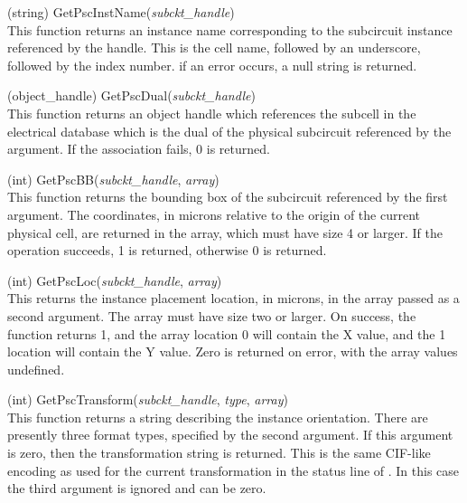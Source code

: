 \begin{description}
\item{(string) \vt GetPscInstName({\it subckt\_handle\/})}\\
This function returns an instance name corresponding to the subcircuit
instance referenced by the handle.  This is the cell name, followed by
an underscore, followed by the index number.  if an error occurs, a
null string is returned.

\item{(object\_handle) \vt GetPscDual({\it subckt\_handle\/})}\\
This function returns an object handle which references the subcell in
the electrical database which is the dual of the physical subcircuit
referenced by the argument.  If the association fails, 0 is returned.

\item{(int) \vt GetPscBB({\it subckt\_handle}, {\it array})}\\
This function returns the bounding box of the subcircuit referenced by
the first argument.  The coordinates, in microns relative to the
origin of the current physical cell, are returned in the array, which
must have size 4 or larger.  If the operation succeeds, 1 is returned,
otherwise 0 is returned.

\item{(int) \vt GetPscLoc({\it subckt\_handle}, {\it array})}\\
This returns the instance placement location, in microns, in the array
passed as a second argument.  The array must have size two or larger. 
On success, the function returns 1, and the array location 0 will
contain the X value, and the 1 location will contain the Y value. 
Zero is returned on error, with the array values undefined.

\item{(int) \vt GetPscTransform({\it subckt\_handle}, {\it type\/},
  {\it array})}\\
This function returns a string describing the instance orientation. 
There are presently three format types, specified by the second
argument.  If this argument is zero, then the {\Xic} transformation
string is returned.  This is the same CIF-like encoding as used for
the current transformation in the status line of {\Xic}.  In this case
the third argument is ignored and can be zero.


\end{description}
